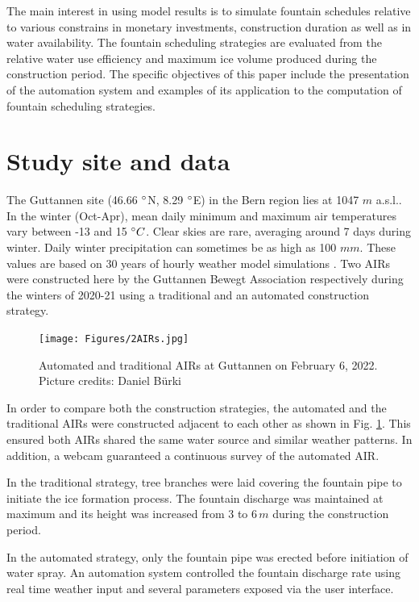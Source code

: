 \documentclass[tc, manuscript]{copernicus}
\begin{document}
The main interest in using model results is to simulate fountain schedules relative to various constrains in
monetary investments, construction duration as well as in water availability. The fountain scheduling strategies
are evaluated from the relative water use efficiency and maximum ice volume produced during the construction
period. The specific objectives of this paper include the presentation of the automation system and examples of
its application to the computation of fountain scheduling strategies.

\section{Study site and data}

The Guttannen site (46.66 $^{\circ}$N, 8.29 $^{\circ}$E) in the Bern region lies at 1047 $m$ a.s.l.. In the winter
(Oct-Apr), mean daily minimum and maximum air temperatures vary between -13 and 15 $^{\circ} C$. Clear skies are
rare, averaging around 7 days during winter. Daily winter precipitation can sometimes be as high as 100 $mm$.
These values are based on 30 years of hourly weather model simulations \citep{guttannen}. Two AIRs were
constructed here by the Guttannen Bewegt Association respectively during the winters of 2020-21 using a
traditional and an automated construction strategy.

\begin{figure}[t]
\texttt{[image: Figures/2AIRs.jpg]}
\caption{Automated and traditional AIRs  at Guttannen on February 6, 2022. Picture credits: Daniel Bürki}
\label{fig:2AIR} 
\end{figure}

In order to compare both the construction strategies, the automated and the traditional AIRs were constructed
adjacent to each other as shown in Fig. \ref{fig:2AIR}. This ensured both AIRs shared the same water source
and similar weather patterns. In addition, a webcam guaranteed a continuous survey of the automated AIR.   

In the traditional strategy, tree branches were laid covering the fountain pipe to initiate the ice formation
process. The fountain discharge was maintained at maximum and its height was increased from 3 to 6\,$m$ during
the construction period.

In the automated strategy, only the fountain pipe was erected before initiation of water spray. An automation
system controlled the fountain discharge rate using real time weather input and several parameters exposed via
the user interface. 
\end{document}
